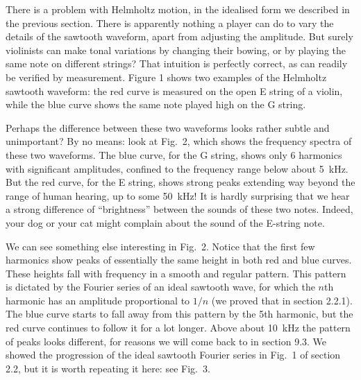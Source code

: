

  There is a problem with Helmholtz motion, in the idealised form we described 
  in the previous section. There is apparently nothing a player can do to vary 
  the details of the sawtooth waveform, apart from adjusting the amplitude. But 
  surely violinists can make tonal variations by changing their bowing, or by 
  playing the same note on different strings? That intuition is perfectly 
  correct, as can readily be verified by measurement. Figure 1 shows two 
  examples of the Helmholtz sawtooth waveform: the red curve is measured on the 
  open E string of a violin, while the blue curve shows the same note played 
  high on the G string. 


  Perhaps the difference between these two waveforms looks rather subtle and 
  unimportant? By no means: look at Fig.\ 2, which shows the frequency spectra 
  of these two waveforms. The blue curve, for the G string, shows only 6 
  harmonics with significant amplitudes, confined to the frequency range below 
  about 5~kHz. But the red curve, for the E string, shows strong peaks 
  extending way beyond the range of human hearing, up to some 50~kHz! It is 
  hardly surprising that we hear a strong difference of “brightness” between 
  the sounds of these two notes. Indeed, your dog or your cat might complain 
  about the sound of the E-string note. 


  We can see something else interesting in Fig.\ 2. Notice that the first few 
  harmonics show peaks of essentially the same height in both red and blue 
  curves. These heights fall with frequency in a smooth and regular pattern. 
  This pattern is dictated by the Fourier series of an ideal sawtooth wave, for 
  which the $n$th harmonic has an amplitude proportional to $1/n$ (we proved 
  that in section 2.2.1). The blue curve starts to fall away from this pattern 
  by the 5th harmonic, but the red curve continues to follow it for a lot 
  longer. Above about 10~kHz the pattern of peaks looks different, for reasons 
  we will come back to in section 9.3. We showed the progression of the ideal 
  sawtooth Fourier series in Fig.\ 1 of section 2.2, but it is worth repeating 
  it here: see Fig.\ 3. 

